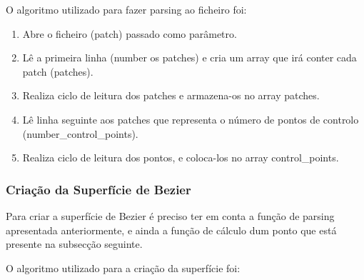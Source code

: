 \documentclass[a4paper]{article}
\begin{document}
O algoritmo utilizado para fazer parsing ao ficheiro foi:

\ttfamily
\begin{enumerate}
  \item Abre o ficheiro (patch) passado como parâmetro.
  \item Lê a primeira linha (number os patches) e cria um array que irá conter cada patch (patches).
  \item Realiza ciclo de leitura dos patches e armazena-os no array patches.
  \item Lê linha seguinte aos patches que representa o número de pontos de controlo (number\_control\_points).
  \item Realiza ciclo de leitura dos pontos, e coloca-los no array control\_points.
\end{enumerate}
\rmfamily


\subsubsection{Criação da Superfície de Bezier}

Para criar a superfície de Bezier é preciso ter em conta a função de parsing apresentada anteriormente, e ainda a função de cálculo dum ponto que está presente na subsecção seguinte.

O algoritmo utilizado para a criação da superfície foi:
\end{document}
